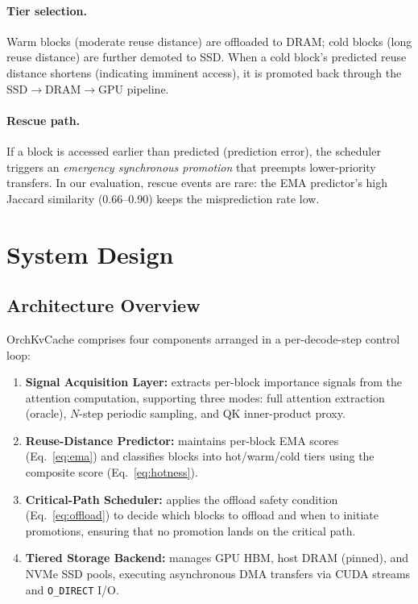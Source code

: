 \documentclass[acmsmall,nonacm,screen]{acmart}
\newcommand{\sys}{OrchKvCache}
\begin{document}
\paragraph{Tier selection.}
Warm blocks (moderate reuse distance) are offloaded to DRAM; cold blocks
(long reuse distance) are further demoted to SSD.  When a cold block's
predicted reuse distance shortens (indicating imminent access), it is
promoted back through the SSD$\to$DRAM$\to$GPU pipeline.

\paragraph{Rescue path.}
If a block is accessed earlier than predicted (prediction error), the
scheduler triggers an \emph{emergency synchronous promotion} that preempts
lower-priority transfers.  In our evaluation, rescue events are rare:
the EMA predictor's high Jaccard similarity (0.66--0.90) keeps the
misprediction rate low.


\section{System Design}\label{sec:design}

\subsection{Architecture Overview}\label{sec:design:arch}

\sys{} comprises four components arranged in a per-decode-step control loop:

\begin{enumerate}
  \item \textbf{Signal Acquisition Layer:}
    extracts per-block importance signals from the attention computation,
    supporting three modes: full attention extraction (oracle), $N$-step
    periodic sampling, and QK inner-product proxy.

  \item \textbf{Reuse-Distance Predictor:}
    maintains per-block EMA scores (Eq.~\ref{eq:ema}) and classifies blocks
    into hot/warm/cold tiers using the composite score (Eq.~\ref{eq:hotness}).

  \item \textbf{Critical-Path Scheduler:}
    applies the offload safety condition (Eq.~\ref{eq:offload}) to decide
    which blocks to offload and when to initiate promotions, ensuring that
    no promotion lands on the critical path.

  \item \textbf{Tiered Storage Backend:}
    manages GPU HBM, host DRAM (pinned), and NVMe SSD pools, executing
    asynchronous DMA transfers via CUDA streams and \texttt{O\_DIRECT} I/O.
\end{enumerate}
\end{document}
